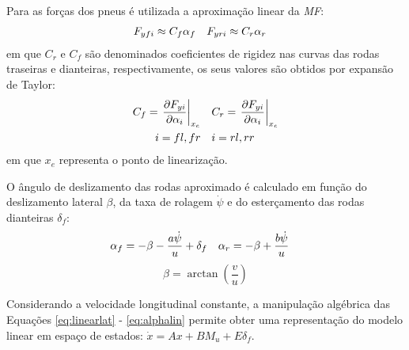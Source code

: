 Para as forças dos pneus é utilizada a aproximação linear da \emph{MF}:
\begin{equation}
	\label{eq:FMF}
\begin{split}
	F_{yfi} \approx C_f\alpha_f \enskip&\enskip F_{yri} \approx C_r\alpha_r
\end{split}
\end{equation} 
\noindent em que $C_r$ e $C_f$ são denominados coeficientes de rigidez nas curvas das rodas traseiras e dianteiras, 
respectivamente, os seus valores são obtidos por expansão de Taylor:
\begin{equation}
\begin{split}
		C_f = \left.\frac{\partial F_{yi}}{\partial \alpha_i}\right|_{x_e} \enskip&\enskip
		C_r = \left.\frac{\partial F_{yi}}{\partial \alpha_i}\right|_{x_e}\\
	i = fl,fr \enskip&\enskip i = rl,rr
	\end{split}
\end{equation}
\noindent em que $x_e$ representa o ponto de linearização.

O ângulo de deslizamento das rodas aproximado é calculado em função do deslizamento lateral $\beta$, 
da taxa de rolagem $\dot{\psi}$ e do esterçamento das rodas dianteiras $\delta_f$:
\begin{equation}
	\label{eq:alphalin}
\begin{split}
		\alpha_f  = -\beta - \frac{a\dot{\psi}}{u} + \delta_f \enskip&\enskip
		\alpha_r  = -\beta + \frac{b\dot{\psi}}{u}
	\end{split}
\end{equation}
\begin{equation}
	\label{eq:beta}
	\beta =\arctan\left(\frac{v}{u}\right)
\end{equation}	

Considerando a velocidade longitudinal constante, a manipulação algébrica das
Equações \ref{eq:linearlat} - \ref{eq:alphalin} permite obter uma representação
do modelo linear em espaço de estados: $\dot{x} = Ax + BM_u+ E\delta_f$.